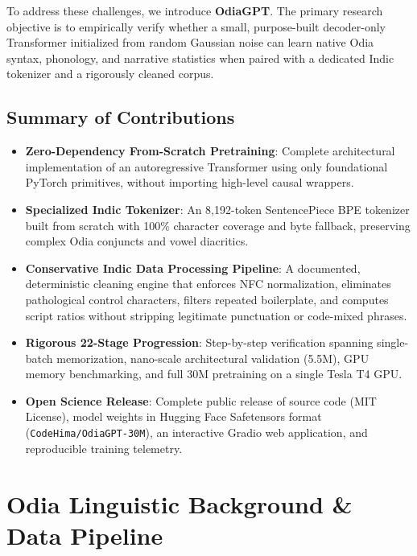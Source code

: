 \documentclass[10pt,twocolumn,letterpaper]{article}
\begin{document}
To address these challenges, we introduce \textbf{OdiaGPT}. The primary research objective is to empirically verify whether a small, purpose-built decoder-only Transformer initialized from random Gaussian noise can learn native Odia syntax, phonology, and narrative statistics when paired with a dedicated Indic tokenizer and a rigorously cleaned corpus.

\subsection{Summary of Contributions}
\begin{itemize}
    \item \textbf{Zero-Dependency From-Scratch Pretraining}: Complete architectural implementation of an autoregressive Transformer using only foundational PyTorch primitives, without importing high-level causal wrappers.
    \item \textbf{Specialized Indic Tokenizer}: An 8,192-token SentencePiece BPE tokenizer built from scratch with 100\% character coverage and byte fallback, preserving complex Odia conjuncts and vowel diacritics.
    \item \textbf{Conservative Indic Data Processing Pipeline}: A documented, deterministic cleaning engine that enforces NFC normalization, eliminates pathological control characters, filters repeated boilerplate, and computes script ratios without stripping legitimate punctuation or code-mixed phrases.
    \item \textbf{Rigorous 22-Stage Progression}: Step-by-step verification spanning single-batch memorization, nano-scale architectural validation (5.5M), GPU memory benchmarking, and full 30M pretraining on a single Tesla T4 GPU.
    \item \textbf{Open Science Release}: Complete public release of source code (MIT License), model weights in Hugging Face Safetensors format (\texttt{CodeHima/OdiaGPT-30M}), an interactive Gradio web application, and reproducible training telemetry.
\end{itemize}

\section{Odia Linguistic Background \& Data Pipeline}
\end{document}
